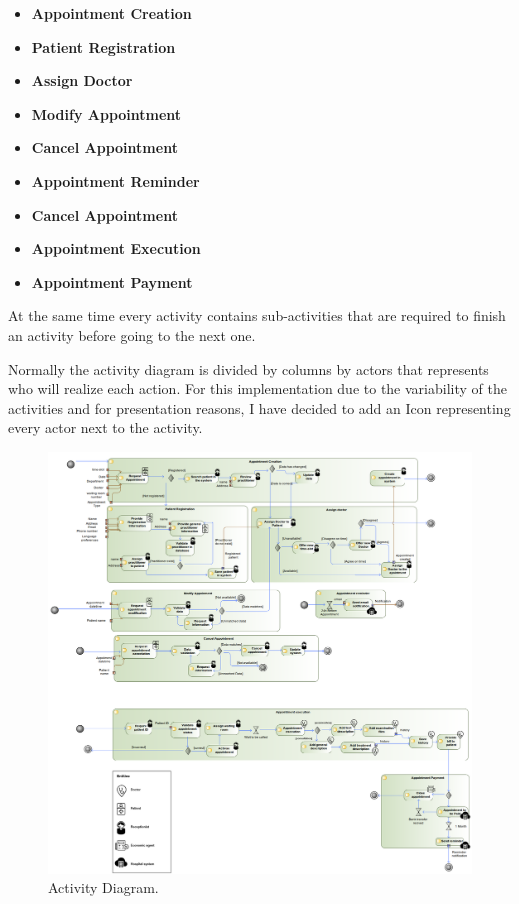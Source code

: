 \documentclass{article}
\begin{document}
            \begin{itemize}
                    \item \textbf{Appointment Creation}
                    \item \textbf{Patient Registration}
                    \item \textbf{Assign Doctor}
                    \item \textbf{Modify Appointment}
                    \item \textbf{Cancel Appointment}
                    \item \textbf{Appointment Reminder}
                    \item \textbf{Cancel Appointment}
                    \item \textbf{Appointment Execution}
                    \item \textbf{Appointment Payment}
            \end{itemize}

            At the same time every activity contains sub-activities that are required to finish an activity before going to the next one.

            Normally the activity diagram is divided by columns by actors that represents who will realize each action. For this implementation due to the variability of the activities and for presentation reasons,
            I have decided to add an Icon representing every actor next to the activity.
            
            \begin{figure}[H]
                \centering 
                \includegraphics[width=1\linewidth]{./img/Activity.png}
                \caption{Activity Diagram.}
                \label{fig:activity}
            \end{figure}
\end{document}
